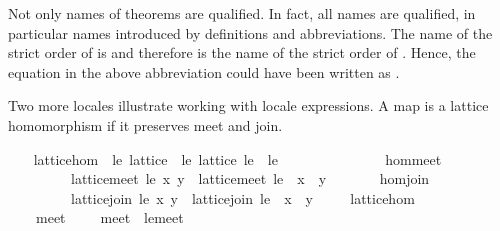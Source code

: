 \begin{isabellebody}
\isamarkuptrue%
%
\begin{isamarkuptext}%
Not only names of theorems are qualified.  In fact, all names
  are qualified, in particular names introduced by definitions and
  abbreviations.  The name of the strict order of \isa{{\isasymsqsubseteq}} is  and therefore  is the name of the strict
  order of \isa{{\isasympreceq}}.  Hence, the equation in the above abbreviation
  could have been written as .%
\end{isamarkuptext}%
\isamarkuptrue%
%
\begin{isamarkuptext}%
Two more locales illustrate working with locale expressions.
  A map \isa{{\isasymphi}} is a lattice homomorphism if it preserves meet and join.%
\end{isamarkuptext}%
\isamarkuptrue%
\ \ \isamarkupfalse%
\ lattice{\isacharunderscore}hom\ {\isacharequal}\ le{\isacharcolon}\ lattice\ {\isacharplus}\ le{\isacharprime}{\isacharcolon}\ lattice\ le{\isacharprime}\ \ le{\isacharprime}\ {\isacharparenleft}\ {\isachardoublequoteopen}{\isasympreceq}{\isachardoublequoteclose}\ {}{}{\isacharparenright}\ {\isacharplus}\isanewline
\ \ \ \ \ {\isasymphi}\isanewline
\ \ \ \ \ hom{\isacharunderscore}meet{\isacharcolon}\isanewline
\ \ \ \ \ \ \ \ {\isachardoublequoteopen}{\isasymphi}\ {\isacharparenleft}lattice{\isachardot}meet\ le\ x\ y{\isacharparenright}\ {\isacharequal}\ lattice{\isachardot}meet\ le{\isacharprime}\ {\isacharparenleft}{\isasymphi}\ x{\isacharparenright}\ {\isacharparenleft}{\isasymphi}\ y{\isacharparenright}{\isachardoublequoteclose}\isanewline
\ \ \ \ \ \ \ hom{\isacharunderscore}join{\isacharcolon}\isanewline
\ \ \ \ \ \ \ \ {\isachardoublequoteopen}{\isasymphi}\ {\isacharparenleft}lattice{\isachardot}join\ le\ x\ y{\isacharparenright}\ {\isacharequal}\ lattice{\isachardot}join\ le{\isacharprime}\ {\isacharparenleft}{\isasymphi}\ x{\isacharparenright}\ {\isacharparenleft}{\isasymphi}\ y{\isacharparenright}{\isachardoublequoteclose}\isanewline
\isanewline
\ \ \isamarkupfalse%
\ {\isacharparenleft}\ lattice{\isacharunderscore}hom{\isacharparenright}\isanewline
\ \ \ \ meet{\isacharprime}\ {\isacharparenleft}\ {\isachardoublequoteopen}{\isasymsqinter}{\isacharprime}{\isacharprime}{\isachardoublequoteclose}\ {}{}{\isacharparenright}\ \ {\isachardoublequoteopen}meet{\isacharprime}\ {\isasymequiv}\ le{\isacharprime}{\isachardot}meet{\isachardoublequoteclose}\isanewline

\end{isabellebody}
